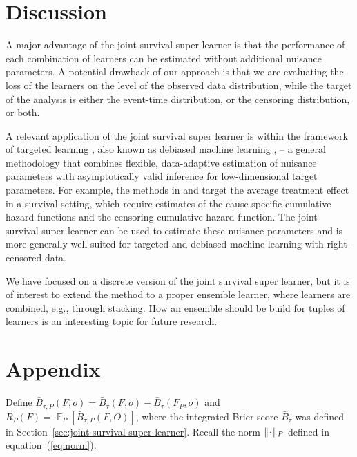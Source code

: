 \documentclass[a4paper,danish]{article}
\DeclareMathOperator{\E}{\mathbb{E}} %
\newcommand{\blank}{\makebox[1ex]{\textbf{$\cdot$}}}
\newcommand{\1}{\mathds{1}}
\theoremstyle{plain} %
\numberwithin{theorem}{section}
\theoremstyle{definition} %
\theoremstyle{remark}
\begin{document}
\section{Discussion}
\label{sec:discussion}

A major advantage of the joint survival super learner is that the
performance of each combination of learners can be estimated without
additional nuisance parameters. A potential drawback of our approach
is that we are evaluating the loss of the learners on the level of the
observed data distribution, while the target of the analysis is either
the event-time distribution, or the censoring distribution, or both.

A relevant application of the joint survival super learner is within
the framework of targeted learning \citep{van2011targeted}, also known
as debiased machine learning \citep{chernozhukov2018double}, -- a
general methodology that combines flexible, data-adaptive estimation
of nuisance parameters with asymptotically valid inference for
low-dimensional target parameters.  For example, the methods in
\cite{van2003unified} and \cite{rytgaard2022targeted} target the
average treatment effect in a survival setting, which require
estimates of the cause-specific cumulative hazard functions and the
censoring cumulative hazard function. The joint survival super learner
can be used to estimate these nuisance parameters and is more
generally well suited for targeted and debiased machine learning with
right-censored data.

We have focused on a discrete version of the joint survival super
learner, but it is of interest to extend the method to a proper
ensemble learner, where learners are combined, e.g., through
stacking. How an ensemble should be build for tuples of learners is an
interesting topic for future research.

\appendix

\section*{Appendix}


Define
\( \bar{B}_{\tau,P}(F, o) = \bar{B}_{\tau}(F, o) -
\bar{B}_{\tau}(F_P, o) \) and
\( R_{P}(F) = \E_P{[\bar{B}_{\tau,P}(F, O)]} \), where the
integrated Brier score \( \bar{B}_{\tau} \) was defined in
Section~\ref{sec:joint-survival-super-learner}. Recall the norm
\( \Vert \blank \Vert_{P}\) defined in
equation~(\ref{eq:norm}).
\end{document}
